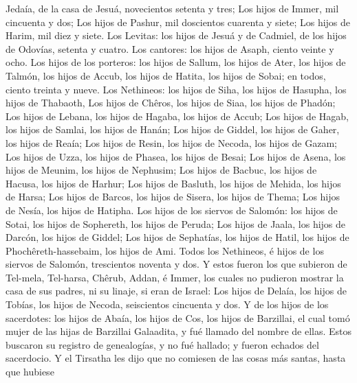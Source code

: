 Jedaía, de la casa de Jesuá, novecientos setenta y tres; 
Los hijos de Immer, mil cincuenta y dos;  Los hijos de
Pashur, mil doscientos cuarenta y siete;  Los hijos de
Harim, mil diez y siete.  Los Levitas: los hijos de Jesuá
y de Cadmiel, de los hijos de Odovías, setenta y cuatro. 
Los cantores: los hijos de Asaph, ciento veinte y ocho. 
Los hijos de los porteros: los hijos de Sallum, los hijos de Ater, los
hijos de Talmón, los hijos de Accub, los hijos de Hatita, los hijos de
Sobai; en todos, ciento treinta y nueve.  Los Nethineos:
los hijos de Siha, los hijos de Hasupha, los hijos de Thabaoth,
 Los hijos de Chêros, los hijos de Siaa, los hijos de
Phadón;  Los hijos de Lebana, los hijos de Hagaba, los
hijos de Accub;  Los hijos de Hagab, los hijos de Samlai,
los hijos de Hanán;  Los hijos de Giddel, los hijos de
Gaher, los hijos de Reaía;  Los hijos de Resin, los hijos
de Necoda, los hijos de Gazam;  Los hijos de Uzza, los
hijos de Phasea, los hijos de Besai;  Los hijos de Asena,
los hijos de Meunim, los hijos de Nephusim;  Los hijos de
Bacbuc, los hijos de Hacusa, los hijos de Harhur;  Los
hijos de Basluth, los hijos de Mehida, los hijos de Harsa;
 Los hijos de Barcos, los hijos de Sisera, los hijos de
Thema;  Los hijos de Nesía, los hijos de Hatipha.
 Los hijos de los siervos de Salomón: los hijos de Sotai,
los hijos de Sophereth, los hijos de Peruda;  Los hijos
de Jaala, los hijos de Darcón, los hijos de Giddel;  Los
hijos de Sephatías, los hijos de Hatil, los hijos de
Phochêreth-hassebaim, los hijos de Ami.  Todos los
Nethineos, é hijos de los siervos de Salomón, trescientos noventa y dos.
 Y estos fueron los que subieron de Tel-mela, Tel-harsa,
Chêrub, Addan, é Immer, los cuales no pudieron mostrar la casa de sus
padres, ni su linaje, si eran de Israel:  Los hijos de
Delaía, los hijos de Tobías, los hijos de Necoda, seiscientos cincuenta
y dos.  Y de los hijos de los sacerdotes: los hijos de
Abaía, los hijos de Cos, los hijos de Barzillai, el cual tomó mujer de
las hijas de Barzillai Galaadita, y fué llamado del nombre de ellas.
 Estos buscaron su registro de genealogías, y no fué
hallado; y fueron echados del sacerdocio.  Y el Tirsatha
les dijo que no comiesen de las cosas más santas, hasta que hubiese
